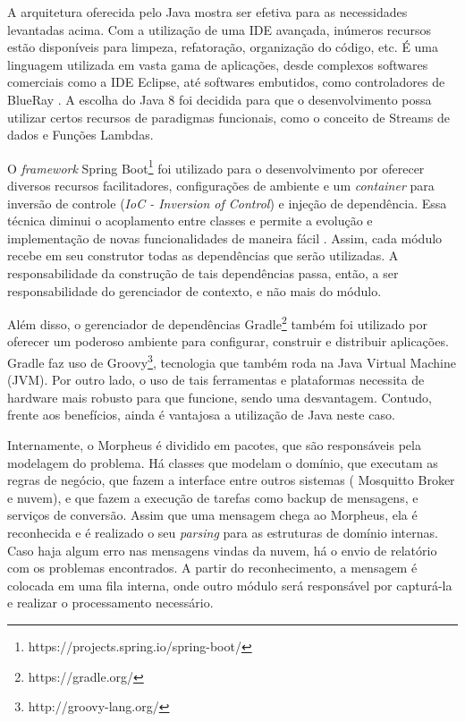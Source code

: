 A arquitetura oferecida pelo Java mostra ser efetiva para as necessidades levantadas acima. Com a utilização de uma IDE avançada, inúmeros recursos estão disponíveis para limpeza, refatoração, organização do código, etc. É uma linguagem utilizada em vasta gama de aplicações, desde complexos softwares comerciais como a IDE Eclipse, até softwares embutidos, como controladores de BlueRay \cite{javaBlueray}. A escolha do Java 8 foi decidida para que o desenvolvimento possa utilizar certos recursos de paradigmas funcionais, como o conceito de Streams de dados e Funções Lambdas.

O \emph{framework} Spring Boot\footnote{https://projects.spring.io/spring-boot/} foi utilizado para o desenvolvimento por oferecer diversos recursos facilitadores, configurações de ambiente e um \emph{container} para inversão de controle (\emph{IoC - Inversion of Control}) e injeção de dependência. Essa técnica diminui o acoplamento entre classes e permite a evolução e implementação de novas funcionalidades de maneira fácil \cite{iocFowler}. Assim, cada módulo recebe em seu construtor todas as dependências que serão utilizadas. A responsabilidade da construção de tais dependências passa, então, a ser responsabilidade do gerenciador de contexto, e não mais do módulo.

Além disso, o gerenciador de dependências Gradle\footnote{https://gradle.org/} também foi utilizado por oferecer um poderoso ambiente para configurar, construir e distribuir aplicações. Gradle faz uso de Groovy\footnote{http://groovy-lang.org/}, tecnologia que também roda na Java Virtual Machine (JVM). Por outro lado, o uso de tais ferramentas e plataformas necessita de hardware mais robusto para que funcione, sendo uma desvantagem. Contudo, frente aos benefícios, ainda é vantajosa a utilização de Java neste caso.

Internamente, o Morpheus é dividido em pacotes, que são responsáveis pela modelagem do problema. Há classes que modelam o domínio, que executam as regras de negócio, que fazem a interface entre outros sistemas (\wmqtt{} Mosquitto Broker e nuvem), e que fazem a execução de tarefas como backup de mensagens, e serviços de conversão.
Assim que uma mensagem chega ao Morpheus, ela é reconhecida e é realizado o seu \emph{parsing} para as estruturas de domínio internas. Caso haja algum erro nas mensagens vindas da nuvem, há o envio de relatório com os problemas encontrados. A partir do reconhecimento, a mensagem é colocada em uma fila interna, onde outro módulo será responsável por capturá-la e realizar o processamento necessário.

